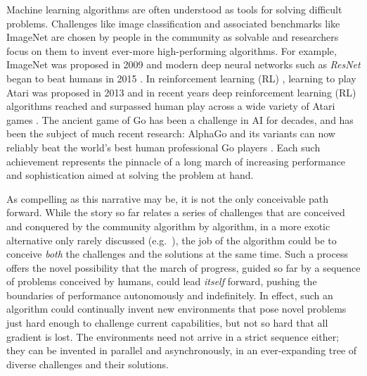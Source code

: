 \documentclass{article}
\newcommand{\todo}[1]{\comments{\textcolor{red}{[TODO: #1]}}}
\newcommand{\ks}[1]{\comments{\textcolor{purple}{[Ken: #1]}}}
\newcommand{\rw}[1]{\comments{\textcolor{blue}{[Rui: #1]}}}
\newcommand{\comments}[1]{#1}
\begin{document}
Machine learning algorithms are often understood as tools for solving difficult problems.  Challenges like image classification and associated benchmarks like ImageNet \cite{Deng2009ImageNetAL} 
are chosen by people in the community as solvable and researchers focus on them to invent ever-more high-performing algorithms.  For example, ImageNet was proposed in 2009 %
and modern deep neural networks such as \textit{ResNet} \cite{he:arxiv15} began to beat humans in 2015 \cite{russakovsky:arxiv14,he2:arxiv15}. 
In reinforcement learning (RL) \cite{sutton1998reinforcement}, learning to play Atari was proposed in 2013 \cite{bellemare2013arcade}
and in recent years deep reinforcement learning (RL) algorithms reached and surpassed human play across a wide variety of Atari games \cite{mnih2015,espeholt2018impala,horgan2018distributed,hessel2018multi,kapturowski2018recurrent,goexplore_blog}.
The ancient game of Go has been a challenge in AI for decades, and has been the subject of much recent research: AlphaGo and its variants can now reliably beat the world's best human professional Go players \cite{SilverHuangEtAl16nature, silver2017mastering, silver2018general}.
Each such achievement represents the pinnacle of a long march of increasing performance and sophistication aimed at solving the problem at hand.

As compelling as this narrative may be, it is not the only conceivable path forward.  While the story so far relates a series of challenges that are conceived and conquered by the community algorithm by algorithm, in a more exotic alternative 
only rarely discussed (e.g.\ \cite{forestier2017intrinsically,schmidhuber2013powerplay}), the job of the
algorithm could be to conceive \emph{both} the challenges and the solutions at the same time.  Such a process offers the novel possibility that the march of progress, guided so far by a sequence of problems
conceived by humans, could lead \emph{itself} forward, pushing the boundaries of performance autonomously and indefinitely.  In effect, such an algorithm could continually invent new environments that pose novel problems just hard enough to challenge current capabilities, but not so hard that all gradient is lost.  The environments need not arrive in a strict sequence either; they can be invented in parallel and asynchronously, in an ever-expanding tree of diverse challenges and their solutions.  
\end{document}
